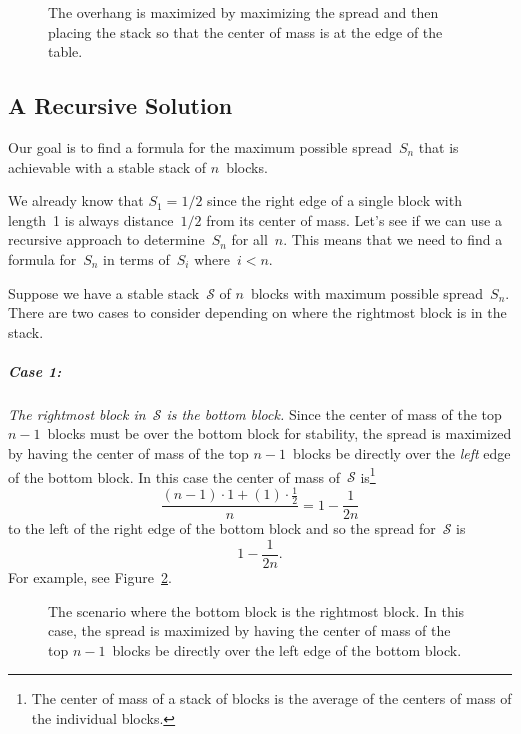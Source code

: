 \begin{figure}


\caption{The overhang is maximized by maximizing the spread and then
  placing the stack so that the center of mass is at the edge of the
  table.}

\label{fig:overhang}

\end{figure}

\subsection{A Recursive Solution}

Our goal is to find a formula for the maximum possible spread~$S_n$
that is achievable with a stable stack of $n$~blocks.

We already know that $S_1 = 1/2$ since the right edge of a single
block with length~1 is always distance~$1/2$ from its center of mass.
Let's see if we can use a recursive approach to determine~$S_n$ for
all~$n$.  This means that we need to find a formula for~$S_n$ in terms
of~$S_i$ where~$i < n$.

Suppose we have a stable stack~$\mathcal{S}$ of $n$~blocks with
maximum possible spread~$S_n$.  There are two cases to consider
depending on where the rightmost block is in the stack.

\subparagraph{Case 1:}

\emph{The rightmost block in~$\mathcal{S}$ is the bottom block.}
Since the center of mass of the top $n - 1$~blocks must be over the
bottom block for stability, the spread is maximized by having the
center of mass of the top $n - 1$~blocks be directly over the
\emph{left} edge of the bottom block.  In this case the center of mass
of~$\mathcal{S}$ is\footnote{The center of mass of a stack of blocks
  is the average of the centers of mass of the individual blocks.}
\begin{equation*}
\frac{ (n - 1) \cdot 1 + (1) \cdot \frac{1}{2} }{ n }
    = 1 - \frac{1}{2n}
\end{equation*}
to the left of the right edge of the bottom block and so the spread
for~$\mathcal{S}$ is
\begin{equation}\label{eqn:9G15}
    1 - \frac{1}{2n}.
\end{equation}
For example, see Figure~\ref{fig:9G14}.

\begin{figure}


\caption{The scenario where the bottom block is the rightmost block.
  In this case, the spread is maximized by having the center of mass
  of the top $n-1$~blocks be directly over the left edge of the bottom
block.}

\label{fig:9G14}

\end{figure}

